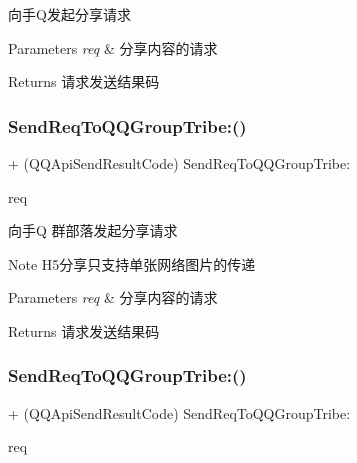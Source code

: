 向手\+Q发起分享请求 
\begin{DoxyParams}{Parameters}
{\em req} & 分享内容的请求 \\
\hline
\end{DoxyParams}
\begin{DoxyReturn}{Returns}
请求发送结果码 
\end{DoxyReturn}
\mbox{\label{interface_q_q_api_interface_a7f4a0e2ff82a3d9ca0ccb8a28ed68dd6}} 
\subsubsection{\texorpdfstring{Send\+Req\+To\+Q\+Q\+Group\+Tribe\+:()}{SendReqToQQGroupTribe:()}\hspace{0.1cm}{\footnotesize\ttfamily [1/2]}}
{\footnotesize\ttfamily + (Q\+Q\+Api\+Send\+Result\+Code) Send\+Req\+To\+Q\+Q\+Group\+Tribe\+: \begin{DoxyParamCaption}\item[{(\mbox{\hyperlink{interface_q_q_base_req}{Q\+Q\+Base\+Req}} $\ast$)}]{req }\end{DoxyParamCaption}}

向手Q 群部落发起分享请求 \begin{DoxyNote}{Note}
H5分享只支持单张网络图片的传递 
\end{DoxyNote}

\begin{DoxyParams}{Parameters}
{\em req} & 分享内容的请求 \\
\hline
\end{DoxyParams}
\begin{DoxyReturn}{Returns}
请求发送结果码 
\end{DoxyReturn}
\mbox{\label{interface_q_q_api_interface_a7f4a0e2ff82a3d9ca0ccb8a28ed68dd6}} 
\subsubsection{\texorpdfstring{Send\+Req\+To\+Q\+Q\+Group\+Tribe\+:()}{SendReqToQQGroupTribe:()}\hspace{0.1cm}{\footnotesize\ttfamily [2/2]}}
{\footnotesize\ttfamily + (Q\+Q\+Api\+Send\+Result\+Code) Send\+Req\+To\+Q\+Q\+Group\+Tribe\+: \begin{DoxyParamCaption}\item[{(\mbox{\hyperlink{interface_q_q_base_req}{Q\+Q\+Base\+Req}} $\ast$)}]{req }\end{DoxyParamCaption}}

